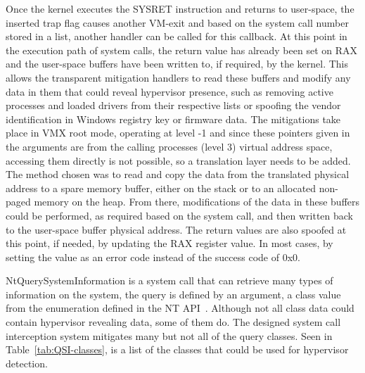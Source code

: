 Once the kernel executes the SYSRET instruction and returns to user-space, the inserted trap flag causes another VM-exit and based on the system call number stored in a list, 
another handler can be called for this callback. At this point in the execution path of system calls, the return value has already been set on RAX and the user-space buffers 
have been written to, if required, by the kernel. This allows the transparent mitigation handlers to read these buffers and modify any data in them 
that could reveal hypervisor presence, such as removing active processes and loaded drivers from their respective lists 
or spoofing the vendor identification in Windows registry key or firmware data.
The mitigations take place in VMX root mode, operating at level -1 and since these pointers given in the arguments are from the calling processes (level 3) virtual address space, 
accessing them directly is not possible, so a translation layer needs to be added. The method chosen was to read and copy the data from the translated physical address to a spare memory buffer, 
either on the stack or to an allocated non-paged memory on the heap. From there, modifications of the data in these buffers could be performed, as required based on the system call, 
and then written back to the user-space buffer physical address.
The return values are also spoofed at this point, if needed, by updating the RAX register value. In most cases, by setting the value as an error code instead of the success code of 0x0. 

NtQuerySystemInformation is a system call that can retrieve many types of information on the system, the query is defined by an argument, 
a class value from the  enumeration defined in the NT API~\cite{ntdll-lib}. 
Although not all class data could contain hypervisor revealing data, some of them do. The designed system call interception system mitigates many 
but not all of the query classes. Seen in Table~\ref{tab:QSI-classes}, is a list of the  classes that could be used for hypervisor detection.

